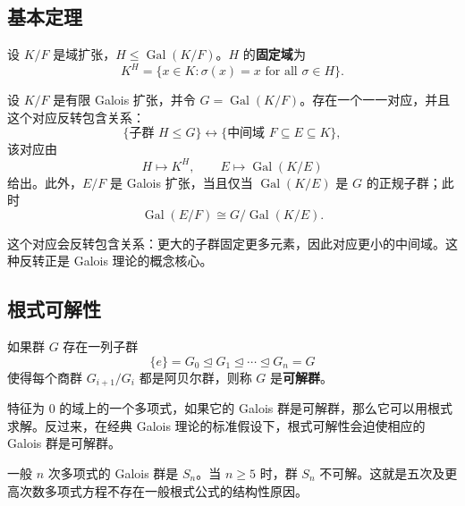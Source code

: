 \subsection{基本定理}

\begin{definition}[固定域]
设 $K/F$ 是域扩张，$H\leq\operatorname{Gal}(K/F)$。$H$ 的\textbf{固定域}为
\[
    K^H=\{x\in K:\sigma(x)=x\text{ for all }\sigma\in H\}.
\]
\end{definition}


\begin{theorem}
设 $K/F$ 是有限 Galois 扩张，并令 $G=\operatorname{Gal}(K/F)$。存在一个一一对应，并且这个对应反转包含关系：
\[
    \{\text{子群 }H\leq G\}
    \longleftrightarrow
    \{\text{中间域 }F\subseteq E\subseteq K\},
\]
该对应由
\[
    H\mapsto K^H,
    \qquad
    E\mapsto \operatorname{Gal}(K/E)
\]
给出。此外，$E/F$ 是 Galois 扩张，当且仅当 $\operatorname{Gal}(K/E)$ 是 $G$ 的正规子群；此时
\[
    \operatorname{Gal}(E/F)\cong G/\operatorname{Gal}(K/E).
\]
\end{theorem}

\begin{remark}
这个对应会反转包含关系：更大的子群固定更多元素，因此对应更小的中间域。这种反转正是 Galois 理论的概念核心。
\end{remark}

\subsection{根式可解性}

\begin{definition}[可解群]
如果群 $G$ 存在一列子群
\[
    \{e\}=G_0\trianglelefteq G_1\trianglelefteq\cdots\trianglelefteq G_n=G
\]
使得每个商群 $G_{i+1}/G_i$ 都是阿贝尔群，则称 $G$ 是\textbf{可解群}。
\end{definition}

\begin{theorem}
特征为 $0$ 的域上的一个多项式，如果它的 Galois 群是可解群，那么它可以用根式求解。反过来，在经典 Galois 理论的标准假设下，根式可解性会迫使相应的 Galois 群是可解群。
\end{theorem}

\begin{remark}
一般 $n$ 次多项式的 Galois 群是 $S_n$。当 $n\geq 5$ 时，群 $S_n$ 不可解。这就是五次及更高次数多项式方程不存在一般根式公式的结构性原因。
\end{remark}

